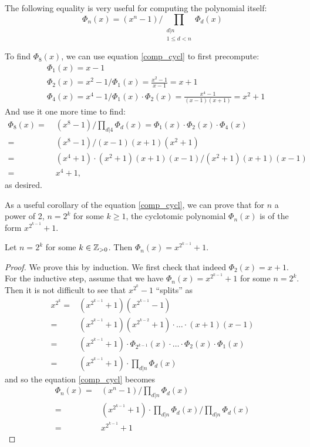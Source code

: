 The following equality is very useful for computing the polynomial itself:
\begin{equation}\label{comp_cycl} 
	\Phi_n(x) = (x^n - 1) \bigg/ \prod_{\substack{d | n\\ 1 \leq d < n}} \Phi_d(x) 
\end{equation}
\begin{example}
	To find $\Phi_8(x)$, we can use equation \ref{comp_cycl} to first precompute:
  \begin{align*}
	  & \Phi_1(x) = x - 1 \\
	  & \Phi_2(x) = x^2-1\Big/\Phi_1(x) = \frac{x^2 - 1}{x-1} = x+1 \\
	  & \Phi_4(x) = x^4-1\Big/\Phi_1(x)\cdot \Phi_2(x) = \frac{x^4-1}{(x-1)(x+1)} = x^2 + 1
  \end{align*}
	  And use it one more time to find:
	  \begin{align*}
		  \Phi_8(x) = \; & (x^8 - 1) \Big/ \prod_{{d | 4}} \Phi_d(x) = \Phi_1(x) \cdot \Phi_2(x) \cdot \Phi_4(x) \\
		  = \; & (x^8 - 1) \Big/(x-1)(x+1)(x^2+1) \\
		  = \; & (x^4+1)\cdot (x^2+1)(x+1)(x-1) \Big/(x^2+1)(x+1)(x-1) \\
		  = \; & x^4 +1,
	  \end{align*}
	  as desired.
\end{example}
As a useful corollary of the equation \ref{comp_cycl}, we can prove that for $n$ a power of 2, $n = 2^k$ for some $k \geq 1$, the cyclotomic polynomial $\Phi_n(x)$ is of the form $x^{2^{k - 1}} + 1$.
\begin{corollary}\label{2k-cycl}
  Let $n= 2^k$ for some $k \in \mathbb{Z}_{> 0}$. Then $\Phi_n(x) = x^{2^{k-1}} + 1$.
\end{corollary}
\begin{proof}
	We prove this by induction. We first check that indeed $\Phi_2(x) = x+1$. For the inductive step, assume that we have $\Phi_n(x) = x^{2^{k-1}} + 1$ for some $n = 2^k$. Then it is not difficult to see that $x^{2^k} -1$ ``splits'' as 
	\begin{align*}
		x^{2^k} = & (x^{2^{k-1}} + 1)(x^{2^{k-1}} - 1) \\
		= & (x^{2^{k-1}} + 1)(x^{2^{k-2}} + 1) \cdot \ldots \cdot (x+1)(x-1) \\
		= & (x^{2^{k-1}} + 1) \cdot \Phi_{2^{k-1}}(x) \cdot \ldots \cdot \Phi_2(x) \cdot \Phi_1(x) \\
		= & (x^{2^{k-1}} + 1) \cdot \prod_{d | n} \Phi_d(x)
	\end{align*}
	and so the equation \ref{comp_cycl} becomes
	\begin{align*}
		\Phi_n(x) = & (x^n - 1) \Big/ \prod_{d|n} \Phi_d(x) \\
		= & (x^{2^{k-1}} + 1) \cdot \prod_{d|n} \Phi_d(x) \Big/ \prod_{d|n} \Phi_d(x)\\
		= & x^{2^{k-1}} + 1
	\end{align*}
\end{proof}

